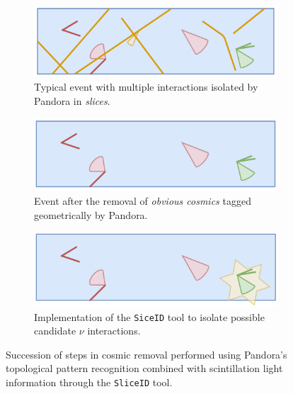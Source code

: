 \begin{figure}[ht] 
\begin{center}
    \begin{subfigure}[b]{0.7\textwidth}
    \centering
    \includegraphics[width=1.00\textwidth]{NuId-Ch3/Images/slice00.png}
    \caption{\label{fig:slcieid:00} Typical event with multiple interactions isolated by Pandora in \emph{slices}.}
    \end{subfigure}
    \begin{subfigure}[b]{0.7\textwidth}
    \centering
    \includegraphics[width=1.00\textwidth]{NuId-Ch3/Images/slice01.png}
    \caption{\label{fig:slcieid:01} Event after the removal of \emph{obvious cosmics} tagged geometrically by Pandora.}
    \end{subfigure}
    \begin{subfigure}[b]{0.7\textwidth}
    \centering
    \includegraphics[width=1.00\textwidth]{NuId-Ch3/Images/slice02.png}
    \caption{\label{fig:slcieid:02} Implementation of the \texttt{SiceID} tool to isolate possible candidate $\nu$ interactions.}
    \end{subfigure}
\caption{\label{fig:sliceid} Succession of steps in cosmic removal performed using Pandora's topological pattern recognition combined with scintillation light information through the \texttt{SliceID} tool.}
\end{center}
\end{figure}


